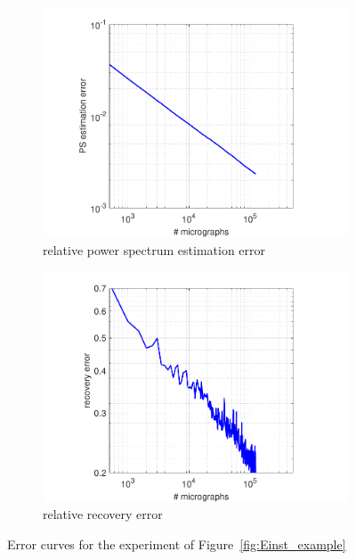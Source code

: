\documentclass[9pt,twocolumn,twoside,lineno]{pnas-new}
\begin{document}
\begin{figure}[h]
	\centering
\begin{subfigure}[h]{0.23\textwidth}
	\centering
	\includegraphics[scale=0.33]{Einstein_ps_error}
	\caption{relative power spectrum estimation error}
\end{subfigure} 
\begin{subfigure}[h]{0.23\textwidth}
	\centering
	\includegraphics[scale=0.33]{Einstein_recovery_error}
	\caption{relative recovery error}
\end{subfigure} 
	\caption{\label{fig:error_per_micro} Error curves for the experiment of Figure~\ref{fig:Einst_example} }
\end{figure}
\end{document}
